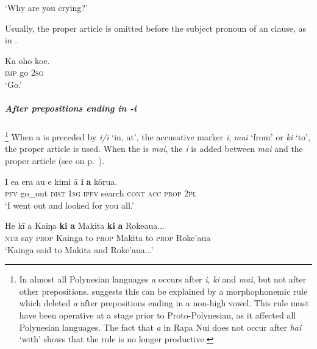 \glt 
‘Why are you crying?’ \textstyleExampleref{[R229.185]} 
\z

Usually, the proper article is omitted before the subject pronoun of an  clause, as in . 

\ea\label{ex:5.190}
\gll Ka oho koe. \\
\textsc{imp} go \textsc{2sg} \\

\glt 
‘Go.’ \textstyleExampleref{[Notes]}
\z

\subparagraph{After prepositions ending in \textit{-i}}\footnote{\label{fn:281} In almost all Polynesian languages \textit{a} occurs after \textit{i}, \textit{ki} and \textit{mai}, but not after other prepositions. \citet[58]{Clark1976} suggests this can be explained by a morphophonemic rule which deleted \textit{a} after prepositions ending in a non-high vowel. This rule must have been operative at a stage prior to Proto-Polynesian, as it affected all Polynesian languages. The fact that \textit{a} in Rapa Nui does not occur after \textit{hai} ‘with’ shows that the rule is no longer productive.} When a  is preceded by \textit{{\ꞌ}i/i} ‘in, at’, the accusative marker \textit{i}, \textit{mai} ‘from’ or \textit{ki} ‘to’, the proper article is used. When the  is \textit{mai}, the  \textit{i} is added between \textit{mai} and the proper article (see  on p.~\pageref{ex:4.272}).

\ea\label{ex:5.191}
\gll I e{\ꞌ}a era au e kimi {\ꞌ}ā \textbf{i} \textbf{a} kōrua. \\
\textsc{pfv} go\_out \textsc{dist} \textsc{1sg} \textsc{ipfv} search \textsc{cont} \textsc{acc} \textsc{prop} \textsc{2pl} \\

\glt 
‘I went out and looked for you all.’ \textstyleExampleref{[R182.012]} 
\z

\ea\label{ex:5.192}
\gll He kī a Kaiŋa \textbf{ki} \textbf{a} Makita \textbf{ki} \textbf{a} Roke{\ꞌ}aua... \\
\textsc{ntr} say \textsc{prop} Kainga to \textsc{prop} Makita to \textsc{prop} Roke’aua \\

\glt 
‘Kainga said to Makita and Roke’aua...’ \textstyleExampleref{[R243.063]} 
\z

